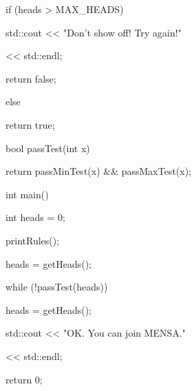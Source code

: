 \begin{consolethree}[escapeinside=||]
{    if (heads > MAX_HEADS)

    {

        std::cout << "Don't show off! Try again!"

                  << std::endl;

        return false;

    }

    else

        return true;

}



bool passTest(int x)

{

    return passMinTest(x) && passMaxTest(x);

}



int main()

{

    int heads = 0;

    printRules();

    heads = getHeads();

    while (!passTest(heads))

    {

        heads = getHeads();

    }

    std::cout << "OK. You can join MENSA."

              << std::endl;

    return 0;

}

\end{consolethree}

